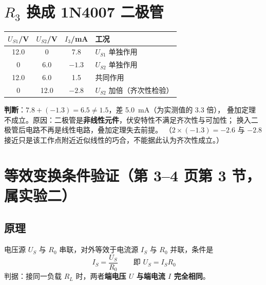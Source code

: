 \documentclass[UTF8,a4paper,10.5pt]{ctexart}
\newcommand{\key}[1]{\textbf{\color{acc}#1}}
\newcommand{\warn}[1]{\textcolor{warnc}{#1}}
\begin{document}
\section{$R_3$ 换成 1N4007 二极管}
\begin{center}
\small
\begin{tabular}{@{}ccc l@{}}
\toprule
$U_{S1}$/V & $U_{S2}$/V & $I_3$/mA & 工况\\
\midrule
12.0 & 0    & 7.8    & $U_{S1}$ 单独作用\\
0    & 6.0  & $-1.3$ & $U_{S2}$ 单独作用\\
12.0 & 6.0  & 1.5    & 共同作用\\
0    & 12.0 & $-2.8$ & $U_{S2}$ 加倍（齐次性检验）\\
\bottomrule
\end{tabular}
\end{center}
\textbf{判断}：$7.8+(-1.3)=6.5\neq1.5$，差 5.0~mA（为实测值的 3.3 倍），
\warn{叠加定理不成立}。原因：二极管是\key{非线性元件}，伏安特性不满足齐次性与可加性；
换入二极管后电路不再是线性电路，叠加定理失去前提。
（$2\times(-1.3)=-2.6$ 与 $-2.8$ 接近只是该工作点附近近似线性的巧合，不能据此认为齐次性成立。）

\section{等效变换条件验证（第 3--4 页第 3 节，属实验二）}
\subsection*{原理}
电压源 $U_S$ 与 $R_0$ 串联，对外等效于电流源 $I_S$ 与 $R_0$ 并联，条件是
\begin{equation}
\boxed{\,I_S=\frac{U_S}{R_0}\,}\qquad\text{即 }U_S=I_SR_0
\end{equation}
判据：接同一负载 $R_L$ 时，两者\key{端电压 $U$ 与端电流 $I$ 完全相同}。
\end{document}
